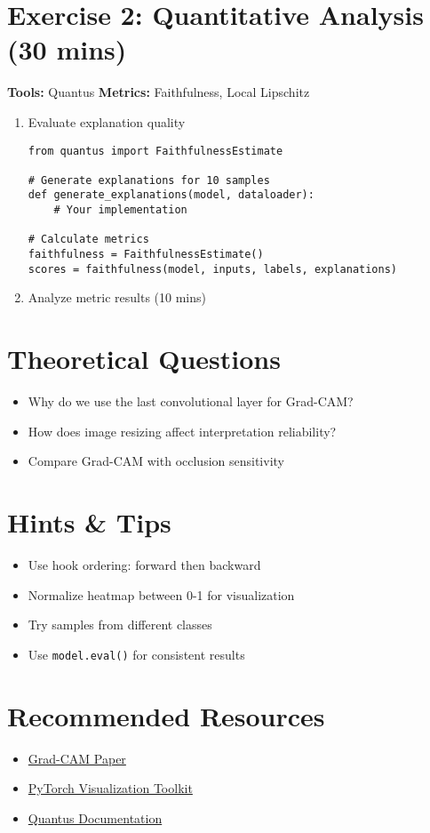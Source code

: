 \section*{Exercise 2: Quantitative Analysis (30 mins)}
\textbf{Tools:} Quantus \quad \textbf{Metrics:} Faithfulness, Local Lipschitz

\begin{enumerate}
\item Evaluate explanation quality
\begin{verbatim}
from quantus import FaithfulnessEstimate

# Generate explanations for 10 samples
def generate_explanations(model, dataloader):
    # Your implementation
    
# Calculate metrics
faithfulness = FaithfulnessEstimate()
scores = faithfulness(model, inputs, labels, explanations)
\end{verbatim}

\item Analyze metric results (10 mins)
\end{enumerate}

\section*{Theoretical Questions}
\begin{itemize}
\item Why do we use the last convolutional layer for Grad-CAM?
\item How does image resizing affect interpretation reliability?
\item Compare Grad-CAM with occlusion sensitivity
\end{itemize}

\section*{Hints \& Tips}
\begin{itemize}
\item Use hook ordering: forward then backward
\item Normalize heatmap between 0-1 for visualization
\item Try samples from different classes
\item Use \texttt{model.eval()} for consistent results
\end{itemize}

\section*{Recommended Resources}
\begin{itemize}
\item \href{https://arxiv.org/abs/1610.02391}{Grad-CAM Paper}
\item \href{https://github.com/utkuozbulak/pytorch-cnn-visualizations}{PyTorch Visualization Toolkit}
\item \href{https://quantus.readthedocs.io/}{Quantus Documentation}
\end{itemize}
